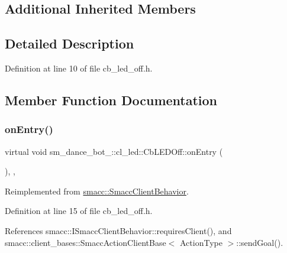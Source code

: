 \subsection*{Additional Inherited Members}


\subsection{Detailed Description}


Definition at line 10 of file cb\+\_\+led\+\_\+off.\+h.



\subsection{Member Function Documentation}
\mbox{\label{classsm__dance__bot__2_1_1cl__led_1_1CbLEDOff_a101b78da1cfd4dcbec6fc607c956bd14}} 
\subsubsection{\texorpdfstring{on\+Entry()}{onEntry()}}
{\footnotesize\ttfamily virtual void sm\+\_\+dance\+\_\+bot\+\_\+::cl\+\_\+led\+::\+Cb\+L\+E\+D\+Off\+::on\+Entry (\begin{DoxyParamCaption}{ }\end{DoxyParamCaption})\hspace{0.3cm}{\ttfamily [inline]}, {\ttfamily [override]}, {\ttfamily [virtual]}}



Reimplemented from \hyperlink{classsmacc_1_1SmaccClientBehavior_ad5d3e1f1697c3cfe66c94cadba948493}{smacc\+::\+Smacc\+Client\+Behavior}.



Definition at line 15 of file cb\+\_\+led\+\_\+off.\+h.



References smacc\+::\+I\+Smacc\+Client\+Behavior\+::requires\+Client(), and smacc\+::client\+\_\+bases\+::\+Smacc\+Action\+Client\+Base$<$ Action\+Type $>$\+::send\+Goal().


